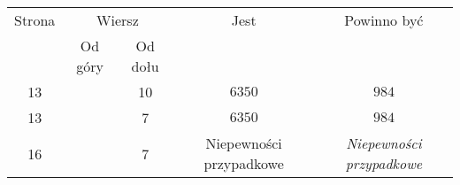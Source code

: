 \documentclass[a4paper,11pt]{article}
\numberwithin{equation}{section}
\begin{document}
\newpage



\begin{center}

  \begin{tabular}{|c|c|c|c|c|}
    \hline
    Strona & \multicolumn{2}{c|}{Wiersz} & Jest
                              & Powinno być \\ \cline{2-3}
    & Od góry & Od dołu & & \\
    \hline
    13 & & 10 & $6350$ & $984$ \\
    13 & & \hphantom{0}7 & $6350$ & $984$ \\
    16 & & \hphantom{0}7 & Niepewności przypadkowe
    & \textit{Niepewności przypadkowe} \\
    \hline
  \end{tabular}

\end{center}

\VerSpaceSix













\printbibliography





\end{document}
